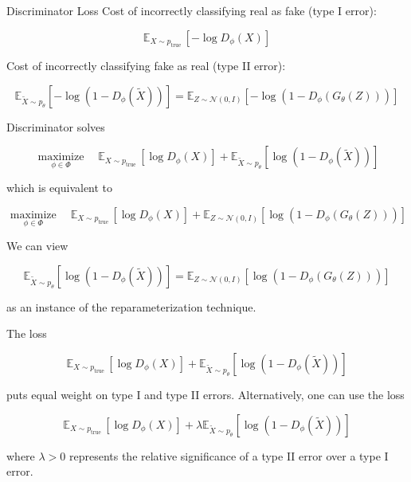 \begin{frame}[allowframebreaks]

\begin{myconceptblock}{12.10}{Discriminator Loss}
    Cost of incorrectly classifying real as fake (type I error):

    $$
    \mathbb{E}_{X \sim p_{\text {true }}}\left[-\log D_{\phi}(X)\right]
    $$

    Cost of incorrectly classifying fake as real (type II error):

    $$
    \mathbb{E}_{\tilde{X} \sim p_{\theta}}\left[-\log \left(1-D_{\phi}(\tilde{X})\right)\right]=\mathbb{E}_{Z \sim \mathcal{N}(0, I)}\left[-\log \left(1-D_{\phi}\left(G_{\theta}(Z)\right)\right)\right]
    $$

    \par\noindent\textcolor{gray}{\hdashrule{\textwidth}{0.4pt}{1pt 2pt}}

    Discriminator solves

    $$
    \underset{\phi \in \Phi}{\operatorname{maximize}} \quad \mathbb{E}_{X \sim p_{\text {true }}}\left[\log D_{\phi}(X)\right]+\mathbb{E}_{\tilde{X} \sim p_{\theta}}\left[\log \left(1-D_{\phi}(\tilde{X})\right)\right]
    $$

    which is equivalent to

    $$
    \underset{\phi \in \Phi}{\operatorname{maximize}} \quad \mathbb{E}_{X \sim p_{\text {true }}}\left[\log D_{\phi}(X)\right]+\mathbb{E}_{Z \sim \mathcal{N}(0, I)}\left[\log \left(1-D_{\phi}\left(G_{\theta}(Z)\right)\right)\right]
    $$

    We can view

    $$
    \mathbb{E}_{\tilde{X} \sim p_{\theta}}\left[\log \left(1-D_{\phi}(\tilde{X})\right)\right]=\mathbb{E}_{Z \sim \mathcal{N}(0, I)}\left[\log \left(1-D_{\phi}\left(G_{\theta}(Z)\right)\right)\right]
    $$

    as an instance of the reparameterization technique.

    \par\noindent\textcolor{gray}{\hdashrule{\textwidth}{0.4pt}{1pt 2pt}}

    The loss

    $$
    \mathbb{E}_{X \sim p_{\text {true }}}\left[\log D_{\phi}(X)\right]+\mathbb{E}_{\tilde{X} \sim p_{\theta}}\left[\log \left(1-D_{\phi}(\tilde{X})\right)\right]
    $$

    puts equal weight on type I and type II errors. Alternatively, one can use the loss

    $$
    \mathbb{E}_{X \sim p_{\text {true }}}\left[\log D_{\phi}(X)\right]+\lambda \mathbb{E}_{\tilde{X} \sim p_{\theta}}\left[\log \left(1-D_{\phi}(\tilde{X})\right)\right]
    $$

    where $\lambda>0$ represents the relative significance of a type II error over a type I error.
\end{myconceptblock}

\end{frame}

